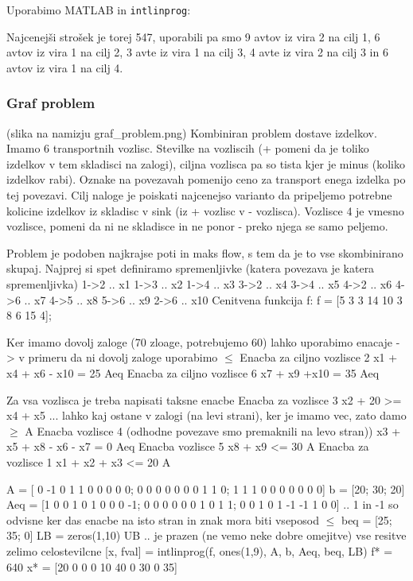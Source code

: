 \documentclass[a4paper,11pt]{article}
\begin{document}
Uporabimo MATLAB in \texttt{intlinprog}:

Najcenejši strošek je torej 547, uporabili pa smo 9 avtov iz vira 2 na cilj 1, 6 avtov iz vira 1 na cilj 2, 3 avte iz vira 1 na cilj 3, 4 avte iz vira 2 na cilj 3 in 6 avtov iz vira 1 na cilj 4.


\subsubsection{Graf problem}

(slika na namizju graf\_problem.png) Kombiniran problem dostave izdelkov. Imamo 6 transportnih vozlisc. Stevilke na vozliscih (+ pomeni da je toliko izdelkov v tem skladisci na zalogi), ciljna vozlisca pa so tista kjer je minus (koliko izdelkov rabi). Oznake na povezavah pomenijo ceno za transport enega izdelka po tej povezavi. Cilj naloge je poiskati najcenejso varianto da pripeljemo potrebne kolicine izdelkov iz skladisc v sink (iz + vozlisc v - vozlisca). Vozlisce 4 je vmesno vozlisce, pomeni da ni ne skladisce in ne ponor - preko njega se samo peljemo.

Problem je podoben najkrajse poti in maks flow, s tem da je to vse skombinirano skupaj. Najprej si spet definiramo spremenljivke (katera povezava je katera spremenljivka)
1->2 .. x1
1->3 .. x2
1->4 .. x3
3->2 .. x4
3->4 .. x5
4->2 .. x6
4->6 .. x7
4->5 .. x8
5->6 .. x9
2->6 .. x10
Cenitvena funkcija f:
f = [5 3 3 14 10 3 8 6 15 4];


Ker imamo dovolj zaloge (70 zloage, potrebujemo 60) lahko uporabimo enacaje -> v primeru da ni dovolj zaloge uporabimo $\leq$
Enacba za ciljno vozlisce 2
x1 + x4 + x6 - x10 = 25   Aeq
Enacba za ciljno vozlisce 6
x7 + x9 +x10 = 35  Aeq

Za vsa vozlisca je treba napisati taksne enacbe
Enacba za vozlisce 3
x2 + 20 >= x4 + x5 ... lahko kaj ostane v zalogi (na levi strani), ker je imamo vec, zato damo $\geq$  A
Enacba vozlisce 4 (odhodne povezave smo premaknili na levo stran))
x3 + x5 + x8 - x6  - x7 = 0  Aeq
Enacba vozlisce 5  
x8 + x9 <= 30  A
Enacba za vozlisce 1
x1 + x2 + x3 <= 20  A


A = [ 0 -1 0 1 1  0 0 0 0 0; 0 0 0 0 0 0 0 1 1 0; 1 1 1 0 0 0 0 0 0 0]
b = [20; 30; 20]
Aeq = [1 0 0 1 0 1 0 0  0 -1; 0 0 0 0 0 0 1 0 1 1;  0 0 1 0 1 -1 -1 1 0 0] .. 1 in -1 so odvisne ker das enacbe na isto stran in znak mora biti vseposod $\leq$
beq = [25; 35; 0]
LB = zeros(1,10)
UB  .. je prazen (ne vemo neke dobre omejitve)
vse resitve zelimo celostevilcne
[x, fval] = intlinprog(f, ones(1,9), A, b, Aeq, beq, LB)
f* = 640
x* = [20 0 0 0 10 40 0 30 0 35]
\end{document}
